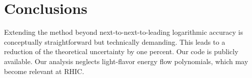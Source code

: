 \section{Conclusions}\label{sec:conclusions}

Extending the method beyond next-to-next-to-leading logarithmic accuracy
is conceptually straightforward but technically demanding. This leads to
a reduction of the theoretical uncertainty by one percent. Our code is
publicly available. Our analysis neglects light-flavor energy flow
polynomials, which may become relevant at RHIC.

